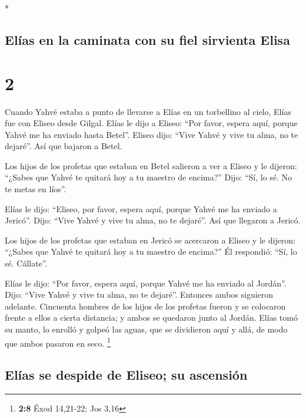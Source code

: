 \begin{paracol}{2}
\begin{otherlanguage}{english}
\end{otherlanguage}

\switchcolumn[0]*

\hypertarget{eluxedas-en-la-caminata-con-su-fiel-sirvienta-elisa}{%
\subsection{Elías en la caminata con su fiel sirvienta
Elisa}\label{eluxedas-en-la-caminata-con-su-fiel-sirvienta-elisa}}

\hypertarget{section-2}{%
\section{2}\label{section-2}}

 Cuando Yahvé estaba a punto de llevarse a Elías en un
torbellino al cielo, Elías fue con Eliseo desde Gilgal. 
Elías le dijo a Eliseo: ``Por favor, espera aquí, porque Yahvé me ha
enviado hasta Betel''. Eliseo dijo: ``Vive Yahvé y vive tu alma, no te
dejaré''. Así que bajaron a Betel.

 Los hijos de los profetas que estaban en Betel salieron a
ver a Eliseo y le dijeron: ``¿Sabes que Yahvé te quitará hoy a tu
maestro de encima?'' Dijo: ``Sí, lo sé. No te metas en líos''.

 Elías le dijo: ``Eliseo, por favor, espera aquí, porque
Yahvé me ha enviado a Jericó''. Dijo: ``Vive Yahvé y vive tu alma, no te
dejaré''. Así que llegaron a Jericó.

 Los hijos de los profetas que estaban en Jericó se
acercaron a Eliseo y le dijeron: ``¿Sabes que Yahvé te quitará hoy a tu
maestro de encima?'' Él respondió: ``Sí, lo sé. Cállate''.

 Elías le dijo: ``Por favor, espera aquí, porque Yahvé me
ha enviado al Jordán''. Dijo: ``Vive Yahvé y vive tu alma, no te
dejaré''. Entonces ambos siguieron adelante.  Cincuenta
hombres de los hijos de los profetas fueron y se colocaron frente a
ellos a cierta distancia; y ambos se quedaron junto al Jordán.
 Elías tomó su manto, lo enrolló y golpeó las aguas, que
se dividieron aquí y allá, de modo que ambos pasaron en seco.
\footnote{\textbf{2:8} Éxod 14,21-22; Jos 3,16}

\hypertarget{eluxedas-se-despide-de-eliseo-su-ascensiuxf3n}{%
\subsection{Elías se despide de Eliseo; su
ascensión}\label{eluxedas-se-despide-de-eliseo-su-ascensiuxf3n}}


\end{paracol}
